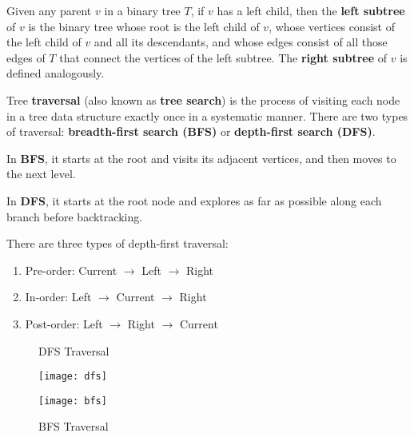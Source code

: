 \documentclass{article}
\begin{document}
\begin{description}
    \item[Left Subtree / Right Subtree]Given any parent $v$ in a binary tree $T$, if $v$ has a left child, then the \textbf{left subtree} of $v$ is the binary tree whose root is the left child of $v$, whose vertices consist of the left child of $v$ and all its descendants, and whose edges consist of all those edges of $T$ that connect the vertices of the left subtree. The \textbf{right subtree} of $v$ is defined analogously.
    \item[Binary Tree Traversal] Tree \textbf{traversal} (also known as \textbf{tree search}) is the process of visiting each node in a tree data structure exactly once in a systematic manner. There are two types of traversal: \textbf{breadth-first search (BFS)} or \textbf{depth-first search (DFS)}. 
    \item \qquad In \textbf{BFS}, it starts at the root and visits its adjacent vertices, and then moves to the next level. 
    \item \qquad In \textbf{DFS}, it starts at the root node and explores as far as possible along each branch before backtracking. 
    \item \qquad There are three types of depth-first traversal: 
	\begin{enumerate}
		\item Pre-order: Current $\to$ Left $\to$ Right
		\item In-order: Left $\to$ Current $\to$ Right 
		\item Post-order: Left $\to$ Right $\to$ Current
	\end{enumerate}
	
	\begin{figure}[H]
		\centering
		\caption{DFS Traversal}
		\texttt{[image: dfs]} \\
		\vspace{0.5cm}
		\caption{BFS Traversal}
		\texttt{[image: bfs]}
	\end{figure}
	

\end{description}
\end{document}
